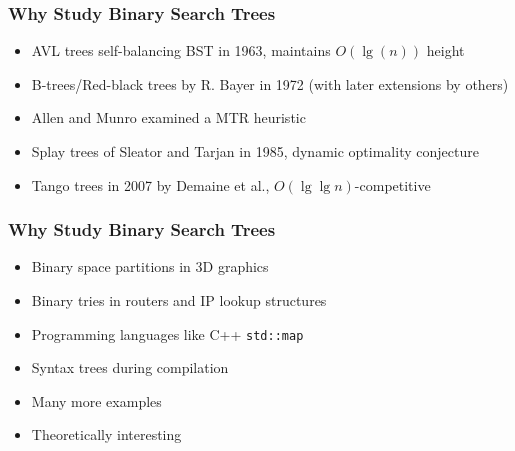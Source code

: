 \documentclass{beamer}
\theoremstyle{plain}
\begin{document}
\begin{frame} \frametitle{Why Study Binary Search Trees}


\begin{itemize}
\item AVL trees self-balancing BST in 1963, maintains $O(\lg(n))$ height \cite{adelsonvelskii1963algorithm}

\item B-trees/Red-black trees by R. Bayer in 1972 (with later extensions by others) \cite{bayer1972symmetric}

\item  Allen and Munro examined a MTR heuristic \cite{allen1978self}

\item Splay trees of Sleator and Tarjan in 1985, dynamic optimality conjecture \cite{sleator1985self}

\item Tango trees in 2007 by Demaine et al., $O(\lg \lg n)$-competitive \cite{demaine2007dynamic}

\end{itemize}

\end{frame}


\begin{frame} \frametitle{Why Study Binary Search Trees}

\begin{itemize}

\item Binary space partitions in 3D graphics \cite{schumacker1969study, paterson1992optimal}

\item Binary tries in routers and IP lookup structures \cite{song2010building}

\item Programming languages like C++ \texttt{std::map} \cite{CppMap} 

\item Syntax trees during compilation \cite{louden1997compiler}

\item Many more examples

\item Theoretically interesting

\end{itemize}

\end{frame}
\end{document}
